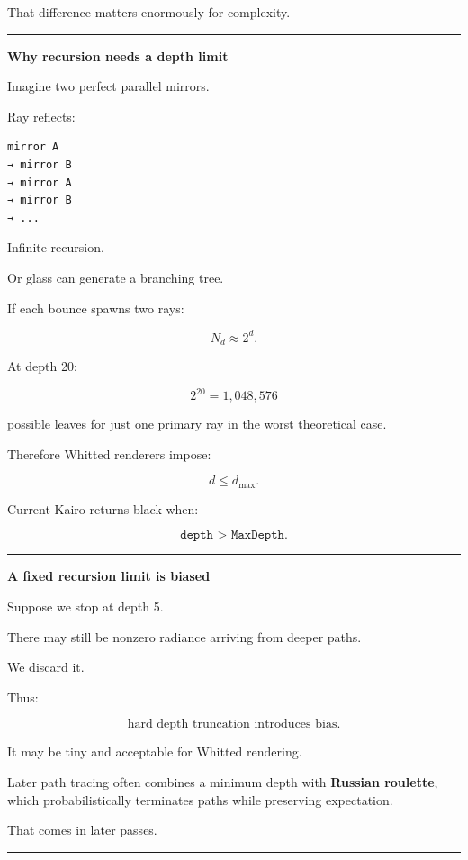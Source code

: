 That difference matters enormously for complexity.

\begin{center}\rule{0.5\linewidth}{0.5pt}\end{center}

\textbf{Why recursion needs a depth limit}

Imagine two perfect parallel mirrors.

Ray reflects:

\begin{verbatim}
mirror A
→ mirror B
→ mirror A
→ mirror B
→ ...
\end{verbatim}

Infinite recursion.

Or glass can generate a branching tree.

If each bounce spawns two rays:

\[
N_d\approx2^d.
\]

At depth 20:

\[
2^{20}
=
1,048,576
\]

possible leaves for just one primary ray in the worst theoretical case.

Therefore Whitted renderers impose:

\[
\boxed{
d\le d_{\max}.
}
\]

Current Kairo returns black when:

\[
\texttt{depth > MaxDepth}.
\]

\begin{center}\rule{0.5\linewidth}{0.5pt}\end{center}

\textbf{A fixed recursion limit is biased}

Suppose we stop at depth 5.

There may still be nonzero radiance arriving from deeper paths.

We discard it.

Thus:

\[
\boxed{
\text{hard depth truncation introduces bias}.
}
\]

It may be tiny and acceptable for Whitted rendering.

Later path tracing often combines a minimum depth with \textbf{Russian roulette}, which probabilistically terminates paths while preserving expectation.

That comes in later passes.

\begin{center}\rule{0.5\linewidth}{0.5pt}\end{center}


